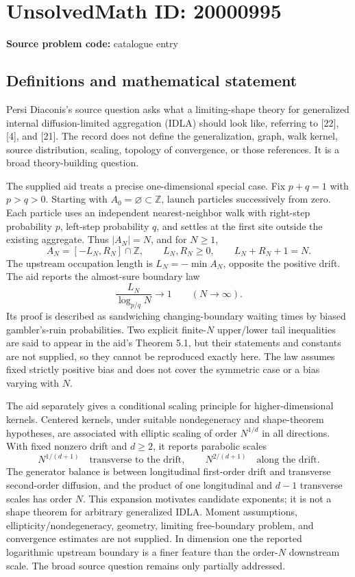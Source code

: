 \documentclass[11pt]{article}
\newcommand{\Z}{\mathbb{Z}}
\begin{document}
\section*{UnsolvedMath ID: 20000995}
\textbf{Source problem code:} catalogue entry
\subsection{Definitions and mathematical statement}
Persi Diaconis's source question asks what a limiting-shape theory for generalized internal diffusion-limited aggregation (IDLA) should look like, referring to [22], [4], and [21]. The record does not define the generalization, graph, walk kernel, source distribution, scaling, topology of convergence, or those references. It is a broad theory-building question.

The supplied aid treats a precise one-dimensional special case. Fix \(p+q=1\) with \(p>q>0\). Starting with \(A_0=\varnothing\subset\Z\), launch particles successively from zero. Each particle uses an independent nearest-neighbor walk with right-step probability \(p\), left-step probability \(q\), and settles at the first site outside the existing aggregate. Thus \(|A_N|=N\), and for \(N\ge1\),
\[
 A_N=[-L_N,R_N]\cap\Z,\qquad L_N,R_N\ge0,
 \qquad L_N+R_N+1=N.
\]
The upstream occupation length is \(L_N=-\min A_N\), opposite the positive drift. The aid reports the almost-sure boundary law
\[
 \frac{L_N}{\log_{p/q}N}\longrightarrow1\qquad(N\to\infty).
\]
Its proof is described as sandwiching changing-boundary waiting times by biased gambler's-ruin probabilities. Two explicit finite-\(N\) upper/lower tail inequalities are said to appear in the aid's Theorem 5.1, but their statements and constants are not supplied, so they cannot be reproduced exactly here. The law assumes fixed strictly positive bias and does not cover the symmetric case or a bias varying with \(N\).

The aid separately gives a conditional scaling principle for higher-dimensional kernels. Centered kernels, under suitable nondegeneracy and shape-theorem hypotheses, are associated with elliptic scaling of order \(N^{1/d}\) in all directions. With fixed nonzero drift and \(d\ge2\), it reports parabolic scales
\[
 N^{1/(d+1)}\quad\text{transverse to the drift},\qquad
 N^{2/(d+1)}\quad\text{along the drift}.
\]
The generator balance is between longitudinal first-order drift and transverse second-order diffusion, and the product of one longitudinal and \(d-1\) transverse scales has order \(N\). This expansion motivates candidate exponents; it is not a shape theorem for arbitrary generalized IDLA. Moment assumptions, ellipticity/nondegeneracy, geometry, limiting free-boundary problem, and convergence estimates are not supplied. In dimension one the reported logarithmic upstream boundary is a finer feature than the order-\(N\) downstream scale. The broad source question remains only partially addressed.
\end{document}
